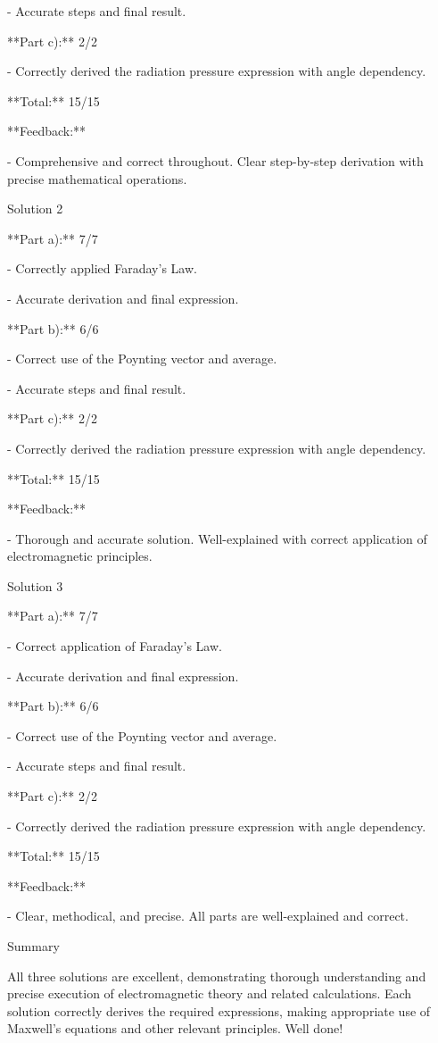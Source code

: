 \documentclass[a4paper,11pt]{article}
\begin{document}
- Accurate steps and final result.

**Part c):** 2/2

- Correctly derived the radiation pressure expression with angle dependency.

**Total:** 15/15

**Feedback:** 

- Comprehensive and correct throughout. Clear step-by-step derivation with precise mathematical operations.

Solution 2

**Part a):** 7/7

- Correctly applied Faraday's Law.

- Accurate derivation and final expression.

**Part b):** 6/6

- Correct use of the Poynting vector and average.

- Accurate steps and final result.

**Part c):** 2/2

- Correctly derived the radiation pressure expression with angle dependency.

**Total:** 15/15

**Feedback:** 

- Thorough and accurate solution. Well-explained with correct application of electromagnetic principles.

Solution 3

**Part a):** 7/7

- Correct application of Faraday's Law.

- Accurate derivation and final expression.

**Part b):** 6/6

- Correct use of the Poynting vector and average.

- Accurate steps and final result.

**Part c):** 2/2

- Correctly derived the radiation pressure expression with angle dependency.

**Total:** 15/15

**Feedback:** 

- Clear, methodical, and precise. All parts are well-explained and correct.

Summary

All three solutions are excellent, demonstrating thorough understanding and precise execution of electromagnetic theory and related calculations. Each solution correctly derives the required expressions, making appropriate use of Maxwell's equations and other relevant principles. Well done!
\end{document}
